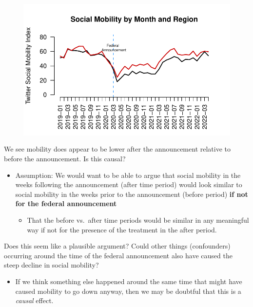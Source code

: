\documentclass[
  letterpaper,
  DIV=11,
  numbers=noendperiod]{scrreprt}
\providecommand{\tightlist}{%
  \setlength{\itemsep}{0pt}\setlength{\parskip}{0pt}}\usepackage{longtable,booktabs,array}
\begin{document}
\begin{figure}[H]

{\centering \includegraphics{05-Causalityii_files/figure-pdf/unnamed-chunk-21-1.pdf}

}

\end{figure}

We see mobility does appear to be lower after the announcement relative
to before the announcement. Is this causal?

\begin{itemize}
\tightlist
\item
  Assumption: We would want to be able to argue that social mobility in
  the weeks following the announcement (after time period) would look
  similar to social mobility in the weeks prior to the announcement
  (before period) \textbf{if not for the federal announcement}

  \begin{itemize}
  \tightlist
  \item
    That the before vs.~after time periods would be similar in any
    meaningful way if not for the presence of the treatment in the after
    period.
  \end{itemize}
\end{itemize}

Does this seem like a plausible argument? Could other things
(confounders) occurring around the time of the federal announcement also
have caused the steep decline in social mobility?

\begin{itemize}
\tightlist
\item
  If we think something else happened around the same time that might
  have caused mobility to go down anyway, then we may be doubtful that
  this is a \emph{causal} effect.
\end{itemize}
\end{document}
